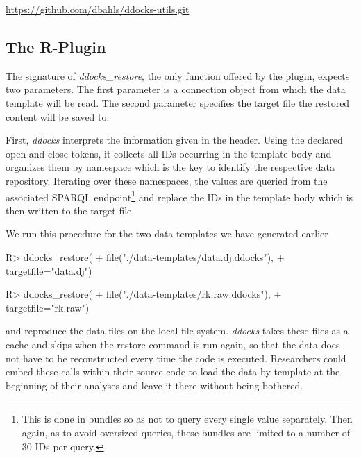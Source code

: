 \documentclass{acm_proc_article-sp}
\begin{document}
%
%

\url{https://github.com/dbahls/ddocks-utils.git}



\subsection{The R-Plugin}


The signature of \textit{ddocks\_restore}, the only function offered by the plugin, expects two parameters.
The first parameter is a connection object from which the data template will be read.
The second parameter specifies the target file the restored content will be saved to.

First, \textit{ddocks} interprets the information given in the header.
Using the declared open and close tokens, it collects all IDs occurring in the template body and organizes them by namespace which is the key to identify the respective data repository.
Iterating over these namespaces, the values are queried from the associated SPARQL endpoint\footnote{This is done in bundles so as not to query every single value separately. Then again, as to avoid oversized queries, these bundles are limited to a number of 30 IDs per query.}
and replace the IDs in the template body which is then written to the target file.



We run this procedure for the two data templates we have generated earlier
\begin{Schunk}
\begin{Sinput}
R> ddocks_restore(
+    file("./data-templates/data.dj.ddocks"), 
+    targetfile="data.dj")
\end{Sinput}
\end{Schunk}

\begin{Schunk}
\begin{Sinput}
R> ddocks_restore(
+    file("./data-templates/rk.raw.ddocks"), 
+    targetfile="rk.raw")
\end{Sinput}
\end{Schunk}
and reproduce the data files on the local file system.
\textit{ddocks} takes these files as a cache and skips when the restore command is run again, so that the data does not have to be reconstructed every time the code is executed.
Researchers could embed these calls within their source code to load the data by template at the beginning of their analyses and leave it there without being bothered.
%
%
\end{document}
